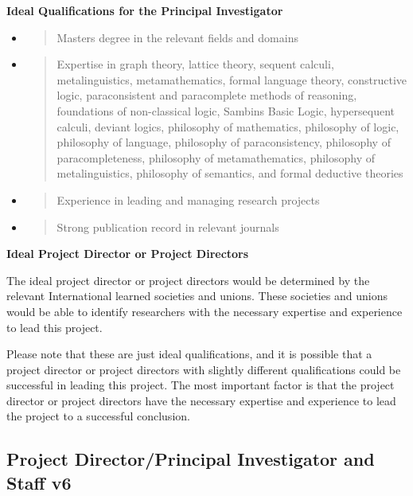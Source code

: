\textbf{Ideal Qualifications for the Principal Investigator}

\begin{itemize}
\item
  \begin{quote}
  Master\textquotesingle s degree in the relevant fields and domains
  \end{quote}
\item
  \begin{quote}
  Expertise in graph theory, lattice theory, sequent calculi,
  metalinguistics, metamathematics, formal language theory, constructive
  logic, paraconsistent and paracomplete methods of reasoning,
  foundations of non-classical logic, Sambin\textquotesingle s Basic
  Logic, hypersequent calculi, deviant logics, philosophy of
  mathematics, philosophy of logic, philosophy of language, philosophy
  of paraconsistency, philosophy of paracompleteness, philosophy of
  metamathematics, philosophy of metalinguistics, philosophy of
  semantics, and formal deductive theories
  \end{quote}
\item
  \begin{quote}
  Experience in leading and managing research projects
  \end{quote}
\item
  \begin{quote}
  Strong publication record in relevant journals
  \end{quote}
\end{itemize}

\textbf{Ideal Project Director or Project Directors}

The ideal project director or project directors would be determined by
the relevant International learned societies and unions. These societies
and unions would be able to identify researchers with the necessary
expertise and experience to lead this project.

Please note that these are just ideal qualifications, and it is possible
that a project director or project directors with slightly different
qualifications could be successful in leading this project. The most
important factor is that the project director or project directors have
the necessary expertise and experience to lead the project to a
successful conclusion.

\hypertarget{project-directorprincipal-investigator-and-staff-v6}{%
\subsection{Project Director/Principal Investigator and Staff
v6}\label{project-directorprincipal-investigator-and-staff-v6}}

